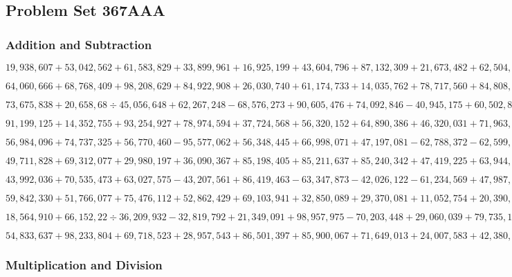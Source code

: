 \hypertarget{problem-set-367aaa}{%
\subsection{Problem Set 367AAA}\label{problem-set-367aaa}}

\hypertarget{addition-and-subtraction}{%
\subsubsection{Addition and
Subtraction}\label{addition-and-subtraction}}

\(19,938,607+53,042,562+61,583,829+33,899,961+16,925,199+43,604,796+87,132,309+21,673,482+62,504,694+41,032,237\)

\(64,060,666+68,768,409+98,208,629+84,922,908+26,030,740+61,174,733+14,035,762+78,717,560+84,808,898+47,594,295\)

\(73,675,838+20,658,68÷45,056,648+62,267,248-68,576,273+90,605,476+74,092,846-40,945,175+60,502,880-36,331,035\)

\(91,199,125+14,352,755+93,254,927+78,974,594+37,724,568+56,320,152+64,890,386+46,320,031+71,963,825+83,487,806\)

\(56,984,096+74,737,325+56,770,460-95,577,062+56,348,445+66,998,071+47,197,081-62,788,372-62,599,299-42,568,582\)

\(49,711,828+69,312,077+29,980,197+36,090,367+85,198,405+85,211,637+85,240,342+47,419,225+63,944,368+10,096,646\)

\(43,992,036+70,535,473+63,027,575-43,207,561+86,419,463-63,347,873-42,026,122-61,234,569+47,987,427+11,970,848\)

\(59,842,330+51,766,077+75,476,112+52,862,429+69,103,941+32,850,089+29,370,081+11,052,754+20,390,834+70,709,107\)

\(18,564,910+66,152,22÷36,209,932-32,819,792+21,349,091+98,957,975-70,203,448+29,060,039+79,735,18÷18,299,850\)

\(54,833,637+98,233,804+69,718,523+28,957,543+86,501,397+85,900,067+71,649,013+24,007,583+42,380,663+23,146,158\)

\hypertarget{multiplication-and-division}{%
\subsubsection{Multiplication and
Division}\label{multiplication-and-division}}

